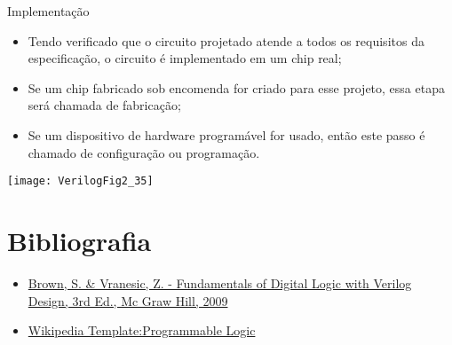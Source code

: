 \begin{frame}{Implementação}
    \begin{itemize}
        \item Tendo verificado que o circuito projetado atende a todos os requisitos da especificação, o circuito é implementado em um chip real;
        \item Se um chip fabricado sob encomenda for criado para esse projeto, essa etapa será chamada de fabricação;
        \item Se um dispositivo de hardware programável for usado, então este passo é chamado de configuração ou programação.
    \end{itemize}
\end{frame}

\begin{frame}{\insertsection}   \centering
    \texttt{[image: VerilogFig2\_35]}
\end{frame}

\section{Bibliografia} %

\begin{frame}{\insertsection} 
	\begin{itemize}
		\item \href{https://www.google.com.br/search?q=filetype\%3Apdf+Fundamentals+of+Digital+Logic+with+Verilog+Design+&oq=filetype\%3Apdf}{Brown, S. \& Vranesic, Z. - Fundamentals of Digital Logic with Verilog Design, 3rd Ed., Mc Graw Hill, 2009}
		\item \href{https://en.wikipedia.org/wiki/Template:Programmable_Logic}{Wikipedia Template:Programmable Logic}
	\end{itemize}
\end{frame}

\begin{frame}
	\titlepage
\end{frame} 

